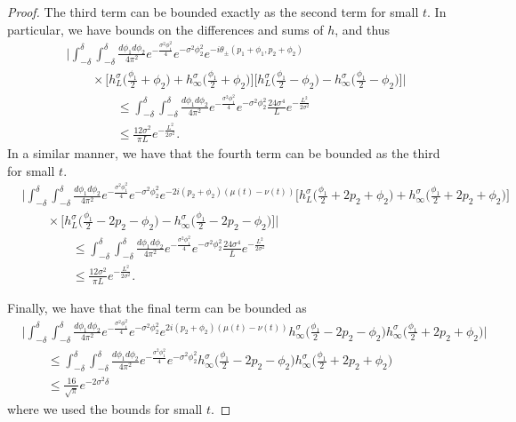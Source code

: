 \documentclass[../thesis-main/thesis-main]{subfiles}
\begin{document}
\begin{proof}
The third term can be bounded exactly as the second term for small $t$.  In particular, we have bounds on the differences and sums of $h$, and thus 
\begin{align}
  &\Bigg| \int_{-\delta}^\delta \int_{-\delta}^\delta \frac{d\phi_1 d\phi_2}{4\pi^2} e^{- \frac{\sigma^2 \phi_1^2}{4}}e^{-\sigma^2 \phi_2^2}e^{- i\theta_{\pm}(p_1 + \phi_1, p_2 + \phi_2)}\nonumber\\
  &\qquad \times \Big[h_L^{\sigma} \Big(\frac{\phi_1}{2} + \phi_2 \Big)  + h_\infty^\sigma \Big(\frac{\phi_1}{2} + \phi_2 \Big)\Big] \Big[ h_{L}^\sigma\Big(\frac{\phi_1}{2} - \phi_2 \Big) - h_\infty^\sigma\Big(\frac{\phi_1}{2} - \phi_2\Big)\Big]\Bigg|\nonumber\\
  &\qquad\qquad \leq \int_{-\delta}^\delta \int_{-\delta}^\delta \frac{d\phi_1 d\phi_2}{4\pi^2} e^{- \frac{\sigma^2 \phi_1^2}{4}}e^{-\sigma^2 \phi_2^2} \frac{24 \sigma^4}{L} e^{-\frac{L^2}{2\sigma^2}}\\
  &\qquad \qquad \leq \frac{12 \sigma^2}{\pi L} e^{-\frac{L^2}{2\sigma^2}}.
\end{align}
In a similar manner, we have that the fourth term can be bounded as the third for small $t$.
\begin{align}
  &\Bigg| \int_{-\delta}^\delta \int_{-\delta}^\delta \frac{d\phi_1 d\phi_2}{4\pi^2} e^{- \frac{\sigma^2 \phi_1^2}{4}}e^{-\sigma^2 \phi_2^2}e^{- 2i (p_2 + \phi_2)(\mu(t) - \nu(t))} \Big[h_L^{\sigma} \Big(\frac{\phi_1}{2} +2p_2 + \phi_2 \Big)  + h_\infty^\sigma \Big(\frac{\phi_1}{2} +2p_2 + \phi_2 \Big)\Big] \nonumber\\
  &\qquad \times\Big[ h_{L}^\sigma\Big(\frac{\phi_1}{2} -2 p_2 - \phi_2 \Big) - h_\infty^\sigma\Big(\frac{\phi_1}{2} -2 p_2 - \phi_2\Big)\Big]\Bigg|\nonumber\\
  & \qquad \qquad \leq \int_{-\delta}^\delta \int_{-\delta}^\delta \frac{d\phi_1 d\phi_2}{4\pi^2} e^{- \frac{\sigma^2 \phi_1^2}{4}}e^{-\sigma^2 \phi_2^2} \frac{24 \sigma^4}{L} e^{-\frac{L^2}{2\sigma^2}}\\
  &\qquad \qquad \leq \frac{12 \sigma^2}{\pi L} e^{-\frac{L^2}{2\sigma^2}}.
\end{align}

Finally, we have that the final term can be bounded as
\begin{align}
  &\Bigg| \int_{-\delta}^\delta \int_{-\delta}^\delta \frac{d\phi_1 d\phi_2}{4\pi^2} e^{- \frac{\sigma^2 \phi_1^2}{4}}e^{-\sigma^2 \phi_2^2} e^{2i (p_2 + \phi_2)(\mu(t) - \nu(t))}h_\infty^\sigma \Big(\frac{\phi_1}{2} -2p_2 - \phi_2 \Big)h_\infty^\sigma \Big(\frac{\phi_1}{2} +2p_2 + \phi_2 \Big)\Bigg| \nonumber\\
  & \qquad \leq \int_{-\delta}^\delta \int_{-\delta}^\delta \frac{d\phi_1 d\phi_2}{4\pi^2} e^{- \frac{\sigma^2 \phi_1^2}{4}}e^{-\sigma^2 \phi_2^2}h_\infty^\sigma \Big(\frac{\phi_1}{2} -2p_2 - \phi_2 \Big)h_\infty^\sigma \Big(\frac{\phi_1}{2} +2p_2 + \phi_2 \Big)\\
  & \qquad \leq \frac{16}{\sqrt{\pi}} e^{-2\sigma^2 \delta}
\end{align} 
where we used the bounds for small $t$.


\end{proof}
\end{document}
